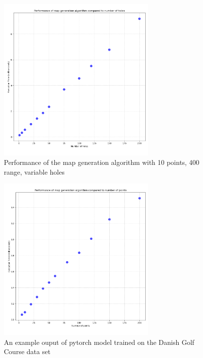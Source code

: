 \documentclass[final]{cmpreport_02}
\begin{document}
\begin{figure}[h!]
	\centering
	\includegraphics[width=0.7\textwidth]{./images/mapGenHolesRT.png}
	\caption{Performance of the map generation algorithm with 10 points, 400 range, variable holes}
	\label{PE:mg:holes}
\end{figure}

\begin{figure}[h!]
	\centering
	\includegraphics[width=0.7\textwidth]{./images/mapGenPointsRT.png}
	\caption{An example ouput of pytorch model trained on the Danish Golf Course data set}
	\label{am:ohGCDanish}
\end{figure}
\end{document}
